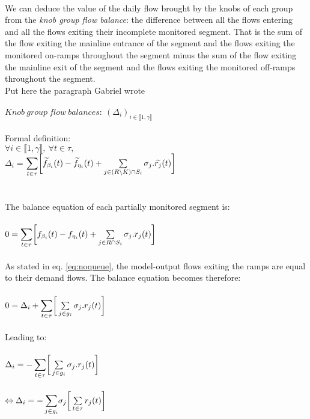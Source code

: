 \\
We can deduce the value of the daily flow brought by the knobs of each group from the \emph{knob group flow balance}: the difference between all the flows entering and all the flows exiting their incomplete monitored segment. That is the sum of the flow exiting the mainline entrance of the segment and the flows exiting the monitored on-ramps throughout the segment minus the sum of the flow exiting the mainline exit of the segment and the flows exiting the monitored off-ramps throughout the segment. \\ 
\color{red}Put here the paragraph Gabriel wrote\color{black}\\
\\
$Knob\ group\ flow\ balances:\ (\Delta_{i})_{i\in \llbracket 1,\gamma \rrbracket} $\\
\\
Formal definition:\\
$\forall i \in \llbracket 1,\gamma \rrbracket,\ \forall t\in \tau,$\\
$\Delta_{i} =$\small $\mathlarger{\sum\limits_{t\in \tau}}\bigg[\widetilde{f}_{\beta_{i}}(t)-\widetilde{f}_{\eta_{i}}(t)+\sum\limits_{j\in (R\backslash K)\cap S_{i}}\sigma_{j}.\widetilde{r_{j}}(t)\bigg]$\normalsize 
\\
\\
\\
The balance equation of each partially monitored segment is:\\
\\
$0=\mathlarger{\sum\limits_{t\in \tau}}\bigg[f_{\beta_{i}}(t)-f_{\eta_{i}}(t)+\sum\limits_{j\in R\cap S_{i}}\sigma_{j}.r_{j}(t)\bigg]$\\
\\
As stated in eq. \ref{eq:noqueue}, the model-output flows exiting the ramps are equal to their demand flows. The balance equation becomes therefore:\\
\\
$0=\Delta_{i}+\mathlarger{\sum\limits_{t\in \tau}}\bigg[\sum\limits_{j\in g_{i}}\sigma_{j}.r_{j}(t)\bigg]$\\
\\
Leading to:\\
\\
$\Delta_{i}=\mathlarger{-\sum\limits_{t\in \tau}}\bigg[\sum\limits_{j\in g_{i}}\sigma_{j}.r_{j}(t)\bigg]$\\
\\
$\Leftrightarrow \Delta_{i}=\mathlarger{-\sum\limits_{j\in g_{i}}}\sigma_{j}\bigg[\sum\limits_{t\in \tau}r_{j}(t)\bigg]$\\

